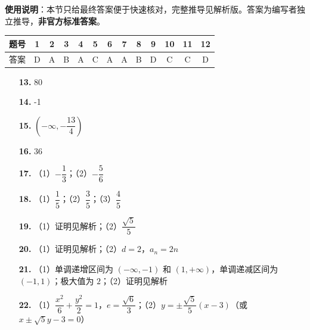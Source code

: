 
\begin{gknotice}
\textbf{使用说明}：本节只给最终答案便于快速核对，完整推导见解析版。答案为编写者独立推导，\textbf{非官方标准答案}。
\end{gknotice}

\begin{center}\begin{tabular}{ccccccccccccc}
\toprule
题号 & 1 & 2 & 3 & 4 & 5 & 6 & 7 & 8 & 9 & 10 & 11 & 12 \\
\midrule
答案 & D & A & B & A & C & A & A & B & D & C & C & D \\
\bottomrule
\end{tabular}\end{center}

\begin{itemize}[leftmargin=2.6em]
  \item[\textbf{13.}] 80
  \item[\textbf{14.}] -1
  \item[\textbf{15.}] $\left(-\infty, -\dfrac{13}{4}\right)$
  \item[\textbf{16.}] 36
\end{itemize}

\begin{itemize}[leftmargin=2.6em]
  \item[\textbf{17.}] （1）$-\dfrac{1}{3}$；（2）$-\dfrac{5}{6}$
  \item[\textbf{18.}] （1）$\dfrac{1}{5}$；（2）$\dfrac{3}{5}$；（3）$\dfrac{4}{5}$
  \item[\textbf{19.}] （1）证明见解析；（2）$\dfrac{\sqrt{5}}{5}$
  \item[\textbf{20.}] （1）证明见解析；（2）$d = 2$，$a_n = 2n$
  \item[\textbf{21.}] （1）单调递增区间为 $(-\infty, -1)$ 和 $(1, +\infty)$，单调递减区间为 $(-1, 1)$；极大值为 $2$；（2）证明见解析
  \item[\textbf{22.}] （1）$\dfrac{x^2}{6} + \dfrac{y^2}{2} = 1$，$e = \dfrac{\sqrt{6}}{3}$；（2）$y = \pm \dfrac{\sqrt{5}}{5}(x - 3)$（或 $x \pm \sqrt{5}y - 3 = 0$）
\end{itemize}
